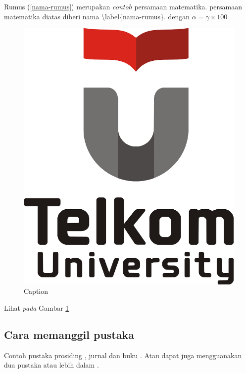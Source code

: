 Rumus (\ref{nama-rumus}) merupakan \textit{contoh} persamaan matematika. persamaan matematika diatas diberi nama \textbackslash label\{nama-rumus\}. dengan $\alpha=\gamma \times 100$

\begin{figure}[h!]
    \centering
    \includegraphics[scale=0.3]{Tel-U-Logo.png}
    \caption{Caption}
    \label{fig:my_label}
\end{figure}

Lihat \textit{pada} Gambar \ref{fig:my_label}

\subsection{Cara memanggil pustaka}
Contoh pustaka prosiding \cite{doyen2014explicit}, jurnal \cite{gunawan2015hydrostatic} dan buku \cite{toro2013riemann}. Atau dapat juga mengguanakan dua pustaka atau lebih dalam \cite{gunawan2015hydrostatic,toro2013riemann}.